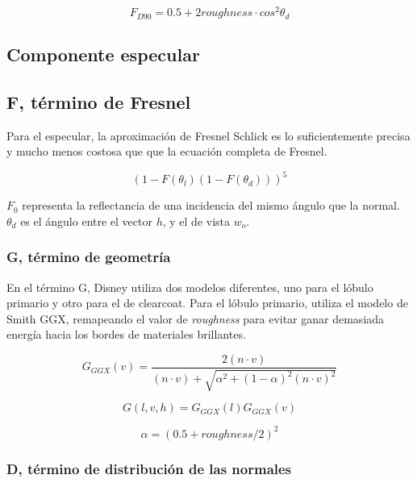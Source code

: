     $$
    F_{D90} = 0.5 + 2roughness\cdot{cos^2\theta_d}
    $$

    \subsection{Componente especular}
        \subsection{F, t\'ermino de Fresnel}
        Para el especular, la aproximaci\'on de Fresnel Schlick es lo suficientemente precisa y mucho menos costosa que
        que la ecuaci\'on completa de Fresnel.

        $$
        (1 - F(\theta_l) (1 - F(\theta_d)))^5
        $$

        $F_0$ representa la reflectancia de una incidencia del mismo \'angulo que la normal. $\theta_d$ es el \'angulo
        entre el vector $h$, y el de vista $w_o$.

        \subsubsection{G, t\'ermino de geometr\'ia}
        En el t\'ermino G, Disney utiliza dos modelos diferentes, uno para el l\'obulo primario y otro para el de clearcoat.
        Para el l\'obulo primario, utiliza el modelo de Smith GGX, remapeando el valor de \textit{roughness} para evitar
        ganar demasiada energ\'ia hacia los bordes de materiales brillantes.

        $$
        G_{GGX}(v) = \frac
        {2 (n \cdot{v})}
        {(n \cdot{v}) + \sqrt{ \alpha^2 + (1 - \alpha)^2 (n \cdot{v})^2 }}
        $$

        $$
        G(l, v, h) = G_{GGX}(l)G_{GGX}(v)
        $$

        $$
        \alpha = (0.5 + roughness / 2)^2
        $$

        \subsubsection{D, t\'ermino de distribuci\'on de las normales}
        

